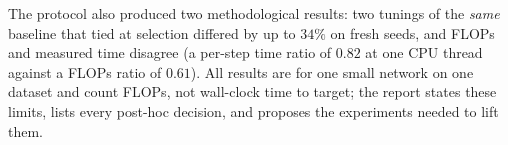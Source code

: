 The protocol also produced two methodological results: two tunings of the \emph{same} baseline that tied at selection differed by up to $34\%$ on fresh seeds, and FLOPs and measured time disagree (a per-step time ratio of $0.82$ at one CPU thread against a FLOPs ratio of $0.61$). All results are for one small network on one dataset and count FLOPs, not wall-clock time to target; the report states these limits, lists every post-hoc decision, and proposes the experiments needed to lift them.
\cleardoublepage
